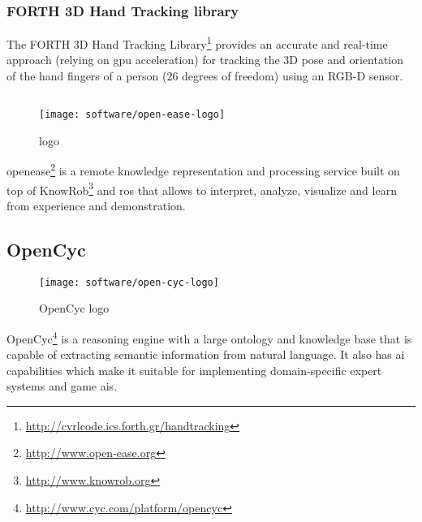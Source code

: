 \subsubsection{FORTH 3D Hand Tracking library}

The FORTH 3D Hand Tracking Library\footnote{\url{http://cvrlcode.ics.forth.gr/handtracking}} \cite{Oikonomidis2011,Kyriazis2012} provides an accurate and real-time approach (relying on \gls{gpu} acceleration) for tracking the 3D pose and orientation of the hand fingers of a person (26 degrees of freedom) using an RGB-D sensor.




\subsection{}

\begin{wrapfigure}{r}{0.23\textwidth}
	\centering
	\vspace*{-2em}
	\texttt{[image: software/open-ease-logo]}
	\caption{ logo}
	\label{fig:open-ease}
\end{wrapfigure}

\gls{openease}\footnote{\url{http://www.open-ease.org}} \cite{Beetz2015} is a remote knowledge representation and processing service built on top of KnowRob\footnote{\url{http://www.knowrob.org}} and \gls{ros} that allows to interpret, analyze, visualize and learn from experience and demonstration.


\subsection{OpenCyc}

\begin{wrapfigure}{r}{0.23\textwidth}
	\centering
	\vspace*{-2em}
	\texttt{[image: software/open-cyc-logo]}
	\caption{OpenCyc logo}
	\label{fig:open-cyc}
\end{wrapfigure}

OpenCyc\footnote{\url{http://www.cyc.com/platform/opencyc}} is a reasoning engine with a large ontology and knowledge base that is capable of extracting semantic information from natural language. It also has \gls{ai} capabilities which make it suitable for implementing domain-specific expert systems and game \glspl{ai}.



